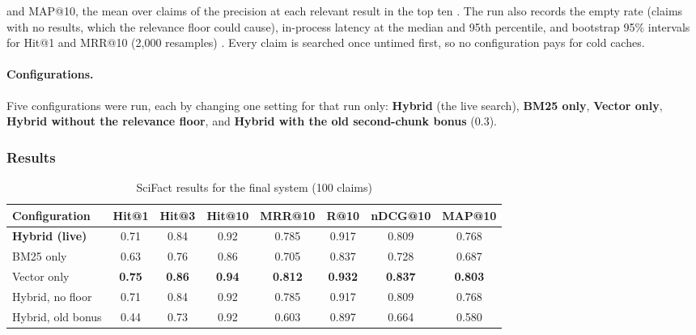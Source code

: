 and MAP@10, the mean over claims of the precision at each relevant result in
the top ten \cite{manning2008ir,jarvelin2002ndcg}. The run also records the
empty rate (claims with no results, which the relevance floor could cause),
in-process latency at the median and 95th percentile, and bootstrap 95\% intervals for Hit@1 and MRR@10 (2{,}000 resamples) \cite{efron1993bootstrap}.
Every claim is searched once untimed first, so no configuration pays for
cold caches.

\paragraph{Configurations.} Five configurations were run, each by changing one setting for that run
only: \textbf{Hybrid} (the live search), \textbf{BM25 only},
\textbf{Vector only}, \textbf{Hybrid without the relevance floor}, and
\textbf{Hybrid with the old second-chunk bonus} (0.3).

\subsubsection{Results}

\begin{table}[H]
\centering
\small
\setlength{\tabcolsep}{2.4pt}
\begin{tabular}{lccccccc}
\toprule
\textbf{Configuration} & \textbf{Hit@1} & \textbf{Hit@3} & \textbf{Hit@10} & \textbf{MRR@10} & \textbf{R@10} & \textbf{nDCG@10} & \textbf{MAP@10} \\
\midrule
\textbf{Hybrid (live)} & 0.71 & 0.84 & 0.92 & 0.785 & 0.917 & 0.809 & 0.768 \\
BM25 only & 0.63 & 0.76 & 0.86 & 0.705 & 0.837 & 0.728 & 0.687 \\
Vector only & \textbf{0.75} & \textbf{0.86} & \textbf{0.94} & \textbf{0.812} & \textbf{0.932} & \textbf{0.837} & \textbf{0.803} \\
Hybrid, no floor & 0.71 & 0.84 & 0.92 & 0.785 & 0.917 & 0.809 & 0.768 \\
Hybrid, old bonus & 0.44 & 0.73 & 0.92 & 0.603 & 0.897 & 0.664 & 0.580 \\
\bottomrule
\end{tabular}
\caption{SciFact results for the final system (100 claims)}
\label{tab:results}
\end{table}

